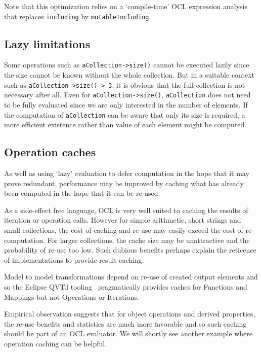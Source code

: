 \documentclass{llncs}
\begin{document}
Note that this optimization relies on a `compile-time' OCL expression analysis that replaces \verb$including$ by \verb$mutableIncluding$.


\subsection{Lazy limitations}

Some operations such as \verb$aCollection->size()$ cannot be executed lazily since the size cannot be known without the whole collection. But in a suitable context such as \verb$aCollection->size() > 3$, it is obvious that the full collection is not necessary after all. Even for \verb$aCollection->size()$, \verb$aCollection$ does not need to be fully evaluated since we are only interested in the number of elements. If the computation of \verb$aCollection$ can be aware that only its size is required, a more efficient existence rather than value of each element might be computed.
 
\subsection{Operation caches}

As well as using `lazy' evaluation to defer computation in the hope that it may prove redundant, performance may be improved by caching what has already been computed in the hope that it can be re-used.

As a side-effect free language, OCL is very well suited to caching the results of iteration or operation calls. However for simple arithmetic, short strings and small collections, the cost of caching and re-use may easily exceed the cost of re-computation. For larger collections, the cache size may be unattractive and the probability of re-use too low. Such dubious benefits perhaps explain the reticence of implementations to provide result caching.

Model to model transformations depend on re-use of created output elements and so the Eclipse QVTd tooling~\cite{Eclipse-QVTd} pragmatically provides caches for Functions and Mappings but not Operations or Iterations.

Empirical observation suggests that for object operations and derived properties, the re-use benefits and statistics are much more favorable and so such caching should be part of an OCL evaluator. We will shortly see another example where operation caching can be helpful.
\end{document}
